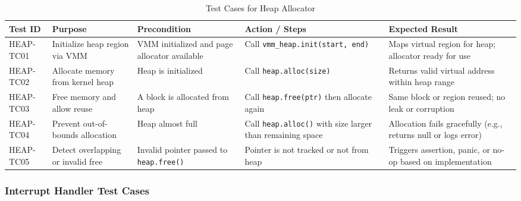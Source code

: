 \documentclass[12pt]{extarticle}
\begin{document}
\begin{table}[H]
\centering
\renewcommand{\arraystretch}{1.3}
\begin{tabular}{|p{1.4cm}|p{3.2cm}|p{3.0cm}|p{3.4cm}|p{3.4cm}|}
\hline
\textbf{Test ID} & \textbf{Purpose} & \textbf{Precondition} & \textbf{Action / Steps} & \textbf{Expected Result} \\
\hline

HEAP-TC01 & Initialize heap region via VMM & VMM initialized and page allocator available & Call \texttt{vmm\_heap.init(start, end)} & Maps virtual region for heap; allocator ready for use \\
\hline

HEAP-TC02 & Allocate memory from kernel heap & Heap is initialized & Call \texttt{heap.alloc(size)} & Returns valid virtual address within heap range \\
\hline

HEAP-TC03 & Free memory and allow reuse & A block is allocated from heap & Call \texttt{heap.free(ptr)} then allocate again & Same block or region reused; no leak or corruption \\
\hline

HEAP-TC04 & Prevent out-of-bounds allocation & Heap almost full & Call \texttt{heap.alloc()} with size larger than remaining space & Allocation fails gracefully (e.g., returns null or logs error) \\
\hline

HEAP-TC05 & Detect overlapping or invalid free & Invalid pointer passed to \texttt{heap.free()} & Pointer is not tracked or not from heap & Triggers assertion, panic, or no-op based on implementation \\
\hline

\end{tabular}
\caption{Test Cases for Heap Allocator}
\label{table:heap-main-tests}
\end{table}

\subsubsection{Interrupt Handler Test Cases}
\end{document}
